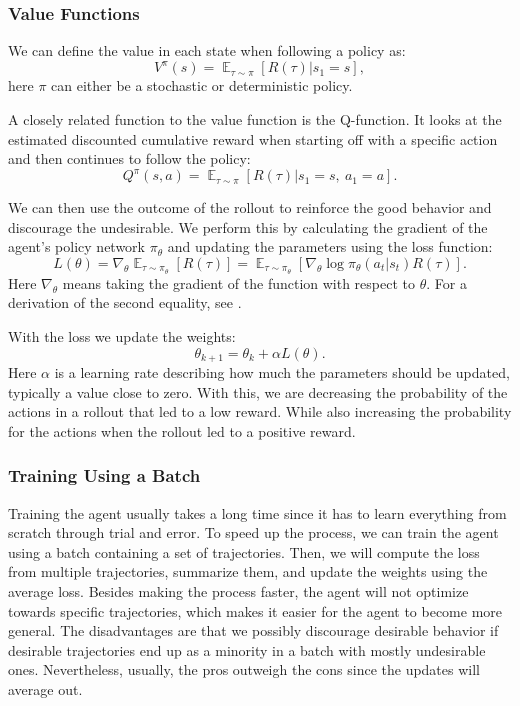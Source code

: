 \documentclass[12pt,A4]{report}
\theoremstyle{definition}
\begin{document}
\subsubsection{Value Functions}

We can define the value in each state when following a policy as:
\[ V^\pi(s) = \mathop{\mathbb{E}}_{\tau \sim \pi} [R(\tau) | s_1 = s],\]
here $\pi$ can either be a stochastic or deterministic policy.

A closely related function to the value function is the Q-function. It looks at the estimated discounted cumulative reward when starting off with a specific action and then continues to follow the policy:
\[ Q^\pi(s, a) = \mathop{\mathbb{E}}_{\tau \sim \pi} [R(\tau) | s_1 = s, \ a_1 = a].\]

We can then use the outcome of the rollout to reinforce the good behavior and discourage the undesirable. We perform this by calculating the gradient of the agent's policy network $\pi_\theta$ and updating the parameters using the loss function:
\[ L(\theta) = \nabla_\theta \mathop{\mathbb{E}}_{\tau \sim \pi_\theta}[R(\tau)] = \mathop{\mathbb{E}}_{\tau \sim \pi_\theta} [\nabla_\theta \log \pi_\theta (a_t|s_t) R(\tau) ]. \]
Here $\nabla_\theta$ means taking the gradient of the function with respect to $\theta$. For a derivation of the second equality, see \citet{OpenAI}. 

With the loss we update the weights:
\[ \theta_{k+1} = \theta_k + \alpha L(\theta).\]
Here $\alpha$ is a learning rate describing how much the parameters should be updated, typically a value close to zero. With this, we are decreasing the probability of the actions in a rollout that led to a low reward. While also increasing the probability for the actions when the rollout led to a positive reward.

\subsubsection{Training Using a Batch}

Training the agent usually takes a long time since it has to learn everything from scratch through trial and error. To speed up the process, we can train the agent using a batch containing a set of trajectories. Then, we will compute the loss from multiple trajectories, summarize them, and update the weights using the average loss. Besides making the process faster, the agent will not optimize towards specific trajectories, which makes it easier for the agent to become more general. The disadvantages are that we possibly discourage desirable behavior if desirable trajectories end up as a minority in a batch with mostly undesirable ones. Nevertheless, usually, the pros outweigh the cons since the updates will average out.
\end{document}
